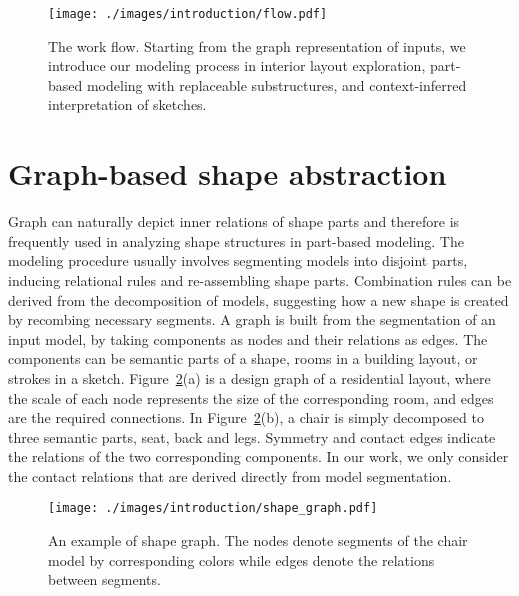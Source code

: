 \begin{figure}[t!]
  \texttt{[image: ./images/introduction/flow.pdf]}
  \caption[Work flow.]{The work flow. Starting from the graph representation of inputs, we introduce our modeling process in interior layout exploration, part-based modeling with replaceable substructures, and context-inferred interpretation of sketches.}
  \label{fig:work_flow}
\end{figure}


\section{Graph-based shape abstraction}

Graph can naturally depict inner relations of shape parts and therefore is frequently used in analyzing shape structures in part-based modeling. The modeling procedure usually involves segmenting models into disjoint parts, inducing relational rules and re-assembling shape parts. Combination rules can be derived from the decomposition of models, suggesting how a new shape is created by recombing necessary segments. A graph is built from the segmentation of an input model, by taking components as nodes and their relations as edges. The components can be semantic parts of a shape, rooms in a building layout, or strokes in a sketch. Figure~\ref{fig:intro_shape_graph}(a) is a design graph of a residential layout, where the scale of each node represents the size of the corresponding room, and edges are the required connections. In Figure~\ref{fig:intro_shape_graph}(b), a chair is simply decomposed to three semantic parts, seat, back and legs. Symmetry and contact edges indicate the relations of the two corresponding components. In our work, we only consider the contact relations that are derived directly from model segmentation.

\begin{figure}\centering
  \texttt{[image: ./images/introduction/shape\_graph.pdf]}
  \caption[An example of shape graph.]{An example of shape graph. The nodes denote segments of the chair model by corresponding colors while edges denote the relations between segments.}
  \label{fig:intro_shape_graph}
\end{figure}

